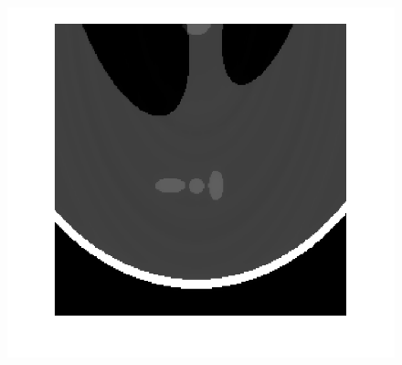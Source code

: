 \documentclass[hyperref]{ctexart}
\begin{document}
{\begin{figure}[htbp]
{				\includegraphics[scale=0.2]{33-2.png}
			}
			\quad
			\quad
		\end{figure}
	
		\begin{multicols}{2}
		

\end{multicols}}
\end{document}
